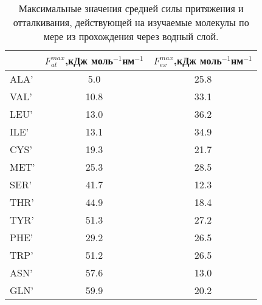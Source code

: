 \begin{table}[p]

	\begin{tabular}{lcc}
	 & $F^{max}_{at}$,кДж моль$^{-1}$нм$^{-1}$ & $F^{max}_{ex}$,кДж моль$^{-1}$нм$^{-1}$\\
	\hline
ALA'  &  5.0  &  25.8 \\
VAL'  & 10.8  &  33.1\\
LEU'  & 13.0  &  36.2\\
ILE'  & 13.1  &  34.9\\
CYS'  & 19.3  &  21.7\\
MET'  & 25.3  &  28.5\\
SER'  & 41.7  &  12.3\\
THR'  & 44.9  &  18.4\\
TYR'  & 51.3  &  27.2\\
PHE'  & 29.2  &  26.5\\
TRP'  & 51.2  &  26.5\\
ASN'  & 57.6  &  13.0\\
GLN'  & 59.9  &  20.2
\end{tabular}

	\caption{Максимальные значения средней силы притяжения и отталкивания, действующей на изучаемые молекулы по мере из прохождения через водный слой.}
	\label{mean_forces}
	\vspace{3 in}
\end{table}
